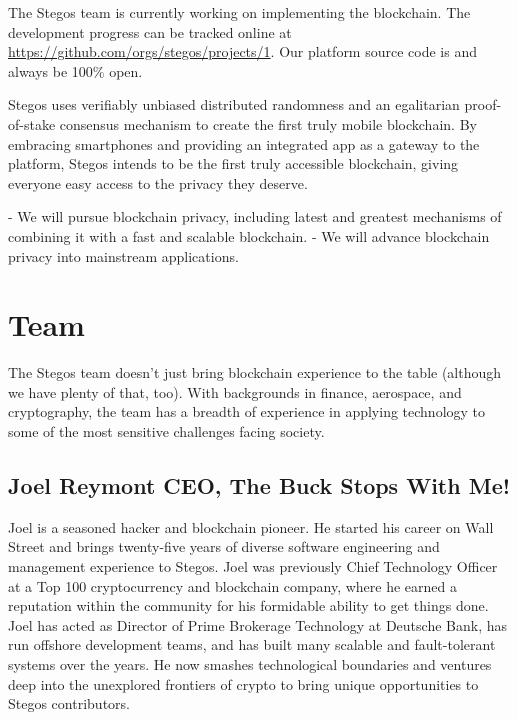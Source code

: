 \documentclass[8pt,fleqn,openany]{book}
\begin{document}
The Stegos team is currently working on implementing the blockchain. The development progress can be tracked online at \url{https://github.com/orgs/stegos/projects/1}. Our platform source code is and always be 100\% open.

Stegos uses verifiably unbiased distributed randomness and an egalitarian proof-of-stake consensus mechanism to create the first truly mobile blockchain. By embracing smartphones and providing an integrated app as a gateway to the platform, Stegos intends to be the first truly accessible blockchain, giving everyone easy access to the privacy they deserve.     

- We will pursue blockchain privacy, including latest and greatest mechanisms of combining it with a fast and scalable blockchain.
- We will advance blockchain privacy into mainstream applications.

\chapter{Team}\label{app:team}

The Stegos team doesn’t just bring blockchain experience to the table (although we have plenty of that, too). With backgrounds in finance, aerospace, and cryptography, the team has a breadth of experience in applying technology to some of the most sensitive challenges facing society.

\section{Joel Reymont CEO, The Buck Stops With Me!}
Joel is a seasoned hacker and blockchain pioneer. He started his career on Wall Street and brings twenty-five years of diverse software engineering and management experience to Stegos. Joel was previously Chief Technology Officer at a Top 100 cryptocurrency and blockchain company, where he earned a reputation within the community for his formidable ability to get things done. Joel has acted as Director of Prime Brokerage Technology at Deutsche Bank, has run offshore development teams, and has built many scalable and fault-tolerant systems over the years. He now smashes technological boundaries and ventures deep into the unexplored frontiers of crypto to bring unique opportunities to Stegos contributors. 
\end{document}
